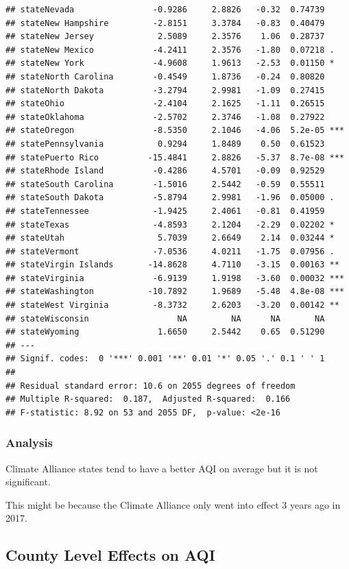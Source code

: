 \documentclass[
  ignorenonframetext,
]{beamer}
\begin{document}
\begin{frame}[fragile]
\begin{verbatim}
## stateNevada                -0.9286     2.8826   -0.32  0.74739    
## stateNew Hampshire         -2.8151     3.3784   -0.83  0.40479    
## stateNew Jersey             2.5089     2.3576    1.06  0.28737    
## stateNew Mexico            -4.2411     2.3576   -1.80  0.07218 .  
## stateNew York              -4.9608     1.9613   -2.53  0.01150 *  
## stateNorth Carolina        -0.4549     1.8736   -0.24  0.80820    
## stateNorth Dakota          -3.2794     2.9981   -1.09  0.27415    
## stateOhio                  -2.4104     2.1625   -1.11  0.26515    
## stateOklahoma              -2.5702     2.3746   -1.08  0.27922    
## stateOregon                -8.5350     2.1046   -4.06  5.2e-05 ***
## statePennsylvania           0.9294     1.8489    0.50  0.61523    
## statePuerto Rico          -15.4841     2.8826   -5.37  8.7e-08 ***
## stateRhode Island          -0.4286     4.5701   -0.09  0.92529    
## stateSouth Carolina        -1.5016     2.5442   -0.59  0.55511    
## stateSouth Dakota          -5.8794     2.9981   -1.96  0.05000 .  
## stateTennessee             -1.9425     2.4061   -0.81  0.41959    
## stateTexas                 -4.8593     2.1204   -2.29  0.02202 *  
## stateUtah                   5.7039     2.6649    2.14  0.03244 *  
## stateVermont               -7.0536     4.0211   -1.75  0.07956 .  
## stateVirgin Islands       -14.8628     4.7110   -3.15  0.00163 ** 
## stateVirginia              -6.9139     1.9198   -3.60  0.00032 ***
## stateWashington           -10.7892     1.9689   -5.48  4.8e-08 ***
## stateWest Virginia         -8.3732     2.6203   -3.20  0.00142 ** 
## stateWisconsin                  NA         NA      NA       NA    
## stateWyoming                1.6650     2.5442    0.65  0.51290    
## ---
## Signif. codes:  0 '***' 0.001 '**' 0.01 '*' 0.05 '.' 0.1 ' ' 1
## 
## Residual standard error: 10.6 on 2055 degrees of freedom
## Multiple R-squared:  0.187,  Adjusted R-squared:  0.166 
## F-statistic: 8.92 on 53 and 2055 DF,  p-value: <2e-16
\end{verbatim}
\end{frame}

\begin{frame}
\frametitle{Analysis}

Climate Alliance states tend to have a better AQI on average but it is
not significant.

This might be because the Climate Alliance only went into effect 3 years
ago in 2017.
\end{frame}

\hypertarget{county-level-effects-on-aqi}{%
\subsection{County Level Effects on
AQI}\label{county-level-effects-on-aqi}}
\end{document}
